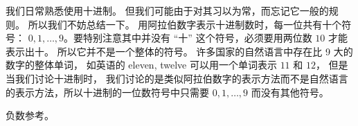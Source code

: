 
\begin{issues}
\issueDraft
\end{issues}

我们日常熟悉使用十进制。 但我们可能由于对其习以为常，而忘记它一般的规则。 所以我们不妨总结一下。 用阿拉伯数字表示十进制数时，每一位共有十个符号： $0,1,\dots, 9$。要特别注意其中并没有 “十” 这个符号，必须要用两位数 $10$ 才能表示出十。 所以它并不是一个整体的符号。 许多国家的自然语言中存在比 9 大的数字的整体单词， 如英语的 eleven, twelve 可以用一个单词表示 $11$ 和 $12$， 但是当我们讨论十进制时， 我们讨论的是类似阿拉伯数字的表示方法而不是自然语言的表示方法，所以十进制的一位数符号中只需要 $0,1,\dots, 9$ 而没有其他符号。

负数参考。

